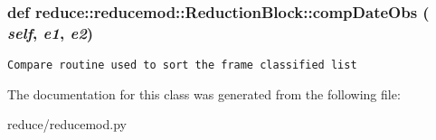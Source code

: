 \subsubsection{\setlength{\rightskip}{0pt plus 5cm}def reduce::reducemod::Reduction\-Block::comp\-Date\-Obs ( {\em self},  {\em e1},  {\em e2})}\label{classreduce_1_1reducemod_1_1ReductionBlock_4e1f5ca524fe7ce52264d1f1424dd121}




\footnotesize\begin{verbatim}Compare routine used to sort the frame classified list\end{verbatim}
\normalsize
 

The documentation for this class was generated from the following file:\begin{CompactItemize}
\item 
reduce/reducemod.py\end{CompactItemize}
